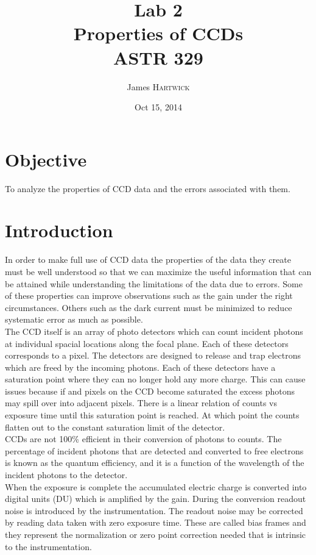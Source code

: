 \documentclass{article}
\title{Lab 2 \\ Properties of CCDs \\ ASTR 329} %
\author{James \textsc{Hartwick}} %
\date{Oct 15, 2014} %
\begin{document}
\maketitle %



\section{Objective}
To analyze the properties of CCD data and the errors associated with them.
\section{Introduction}
In order to make full use of CCD data the properties of the data they create must be well understood so that we can maximize the useful information that can be attained while understanding the limitations of the data due to errors. Some of these properties can improve observations such as the gain under the right circumstances. Others such as the dark current must be minimized to reduce systematic error as much as possible.\\

The CCD itself is an array of photo detectors which can count incident photons at individual spacial locations along the focal plane. Each of these detectors corresponds to a pixel. The detectors are designed to release and trap electrons which are freed by the incoming photons. Each of these detectors have a saturation point where they can no longer hold any more charge. This can cause issues because if and pixels on the CCD become saturated the excess photons may spill over into adjacent pixels. There is a linear relation of counts vs exposure time until this saturation point is reached. At which point the counts flatten out to the constant saturation limit of the detector.\\

CCDs are not 100\% efficient in their conversion of photons to counts. The percentage of incident photons that are detected and converted to free electrons is known as the quantum efficiency, and it is a function of the wavelength of the incident photons to the detector.\\

When the exposure is complete the accumulated electric charge is converted into digital units (DU) which is amplified by the gain. During the conversion readout noise is introduced by the instrumentation. The readout noise may be corrected by reading data taken with zero exposure time. These are called bias frames and they represent the normalization or zero point correction needed that is intrinsic to the instrumentation.\\
\end{document}

